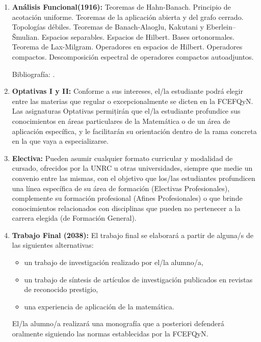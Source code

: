 \documentclass[a4paper, 12pt]{article}
\begin{document}
\begin{enumerate}
 
 \item\textbf{Análisis Funcional(1916):}  Teoremas de Hahn-Banach. Principio de acotación uniforme.  Teoremas de la aplicación abierta y del grafo cerrado. Topologías débiles. Teoremas de Banach-Alaoglu,  Kakutani y  Eberlein–Šmulian. Espacios separables. Espacios de Hilbert. Bases ortonormales. Teorema de Lax-Milgram. Operadores en espacios de Hilbert. Operadores compactos. Descomposición espectral de operadores compactos autoadjuntos.

Bibliografía: \cite{HaimBrezis130,EmmanueleDibenedetto159,FrancisClarke335,JohnBConway489,MichelWillem870,WalterRudin1039, MischaCotlar1454}.

\item\textbf{Optativas I y II:} Conforme a sus intereses, el/la estudiante podrá elegir entre las materias que regular o excepcionalmente se dicten en la FCEFQyN. Las asignaturas Optativas permițirán que el/la estudiante profundice sus conocimientos en áreas particulares de la Matemática o de un área de aplicación específica, y le facilitarán su orientación dentro de la rama concreta en la que vaya a especializarse.


\item\textbf{Electiva:}
Pueden asumir cualquier formato curricular y modalidad de cursado, ofrecidos por la UNRC u otras universidades, siempre que medie un convenio entre las mismas, con el objetivo que los/las estudiantes profundicen una línea específica de su área de formación (Electivas Profesionales), complemente su formación profesional (Afines Profesionales) o que brinde conocimientos relacionados con disciplinas que pueden no pertenecer a la carrera elegida (de Formación General).


\item\textbf{Trabajo Final (2038):} El trabajo
final se elaborará a partir de alguna/s de las siguientes
alternativas:
\begin{itemize}
\item un trabajo de investigación realizado por el/la alumno/a,
\item un trabajo de síntesis de artículos de investigación publicados en
revistas de reconocido prestigio,
\item una experiencia de aplicación de la matemática.
\end{itemize}

El/la alumno/a realizará una monografía  que a posteriori defenderá
oralmente siguiendo las normas establecidas por la FCEFQyN.

\end{enumerate}
\end{document}
